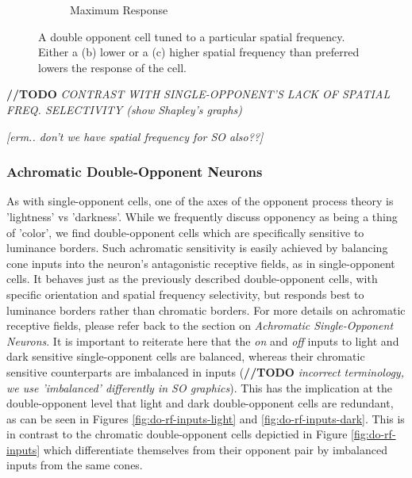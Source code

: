 \documentclass[journal,onecolumn]{IEEEtran}
\begin{document}
\begin{figure}[ht]
\begin{subfigure}{0.2\textwidth}
        \caption{Maximum Response}
    \end{subfigure}%
    \caption{A double opponent cell tuned to a particular spatial frequency. Either a (b) lower or a (c) higher spatial frequency than preferred lowers the response of the cell.} \label{fig:do-scale}
\end{figure}

\bigskip

\textbf{//TODO} \textit{CONTRAST WITH SINGLE-OPPONENT'S LACK OF SPATIAL FREQ. SELECTIVITY (show Shapley's graphs)}

\textit{[erm.. don't we have spatial frequency for SO also??]}

\bigskip

\subsubsection*{Achromatic Double-Opponent Neurons}

As with single-opponent cells, one of the axes of the opponent process theory is 'lightness' vs 'darkness'. While we frequently discuss opponency as being a thing of 'color', we find double-opponent cells which are specifically sensitive to luminance borders.
Such achromatic sensitivity is easily achieved by balancing cone inputs into the neuron's antagonistic receptive fields, as in single-opponent cells. It behaves just as the previously described double-opponent cells, with specific orientation and spatial frequency selectivity, but responds best to luminance borders rather than chromatic borders. For more details on achromatic receptive fields, please refer back to the section on \textit{Achromatic Single-Opponent Neurons}.
It is important to reiterate here that the \textit{on} and \textit{off} inputs to light and dark sensitive single-opponent cells are balanced, whereas their chromatic sensitive counterparts are imbalanced in inputs (\textbf{//TODO} \textit{incorrect terminology, we use 'imbalanced' differently in SO graphics}). This has the implication at the double-opponent level that light and dark double-opponent cells are redundant, as can be seen in Figures \ref{fig:do-rf-inputs-light} and \ref{fig:do-rf-inputs-dark}. This is in contrast to the chromatic double-opponent cells depictied in Figure \ref{fig:do-rf-inputs} which differentiate themselves from their opponent pair by imbalanced inputs from the same cones.
\end{document}
